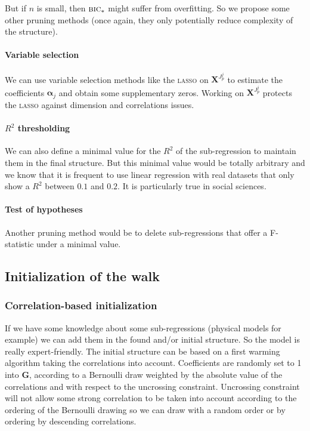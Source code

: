 \documentclass[12pt,a4paper]{report}
\begin{document}
			But if $n$ is small, then $\mbox{{\sc bic}}_*$ might suffer from overfitting.%
			 So we propose some other pruning methods (once again, they only potentially reduce complexity of the structure).
		
		\paragraph{Variable selection}
			We can use variable selection methods like the \textsc{lasso} on $\boldsymbol{X}^{J_p^j}$ to estimate the coefficients $\boldsymbol{\alpha}_j$ and obtain some supplementary zeros. Working on $\boldsymbol{X}^{J_p^j}$ protects the \textsc{lasso} against dimension and correlations issues.
		\paragraph{$R^2$ thresholding }
			We can also define a minimal value for the $R^2$ of the sub-regression to maintain them in the final structure. But this minimal value would be totally arbitrary and we know that it is frequent to use linear regression with real datasets that only show a $R^2$ between $0.1$ and $0.2$. It is particularly true in social sciences.
		\paragraph{Test of hypotheses}
			Another pruning method would be to delete sub-regressions that offer a F-statistic under a minimal value.
		
			



			
	\subsection{Initialization of the walk}
		\subsubsection{Correlation-based initialization}
		 If we have some knowledge about some sub-regressions (physical models for example) we can add them in the found and/or initial structure. So the model is really expert-friendly.
The initial structure can be based on a first warming algorithm taking the correlations into account. Coefficients are randomly set to 1 into $\boldsymbol{G}$, according to a Bernoulli draw weighted by the absolute value of the correlations and with respect to the uncrossing constraint. Uncrossing constraint will not allow some strong correlation to be taken into account according to the ordering of the Bernoulli drawing so we can draw with a random order or by ordering by descending correlations.\\
		
\end{document}
